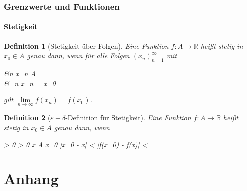 \documentclass{article}
\newtheorem{defn}{Definition}[section]
\newenvironment{aleq*}{\begin{equation*}\begin{aligned}}{\end{aligned}\end{equation*}}
\begin{document}
	\section{Grenzwerte und Funktionen}
	\subsection{Stetigkeit}
	\begin{defn}[Stetigkeit über Folgen]
		\label{defStetigkeitFolgen}
		Eine Funktion \(f \colon A \to \mathbb{R}\) heißt stetig in \(x_0 \in A\) genau dann, wenn für alle Folgen \((x_n)_{n=1}^\infty\) mit 
		\begin{aleq*}
			&\forall n \colon x_n \in A \\
			\land &\lim_{n \to \infty} x_n = x_0
		\end{aleq*}
		
		gilt \(\lim\limits_{n \to \infty}  f(x_n) = f(x_0)\).
	\end{defn}
	
	\begin{defn}[\(\varepsilon-\delta\)-Definition für Stetigkeit]
		\label{defStetigkeitDeltaEpsilon}
		Eine Funktion \(f \colon A \to \mathbb{R}\) heißt stetig in \(x_0 \in A\) genau dann, wenn
		\begin{aleq*}
			\forall \varepsilon > 0 \colon \exists \delta > 0 \colon \forall x \in A \setminus \left\lbrace x_0 \right\rbrace \colon |x_0 - x| < \delta \implies |f(x_0) - f(x)| < \varepsilon \text{.}
		\end{aleq*}
	\end{defn}
	
	
	\newpage
	
	\part{Anhang}
	
\end{document}
